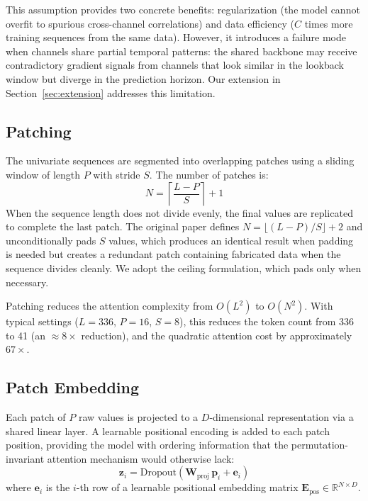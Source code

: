 \documentclass[11pt]{article}
\begin{document}
This assumption provides two concrete benefits: regularization (the model cannot overfit to spurious cross-channel correlations) and data efficiency ($C$ times more training sequences from the same data). However, it introduces a failure mode when channels share partial temporal patterns: the shared backbone may receive contradictory gradient signals from channels that look similar in the lookback window but diverge in the prediction horizon. Our extension in Section~\ref{sec:extension} addresses this limitation.

\subsection{Patching}

The univariate sequences are segmented into overlapping patches using a sliding window of length $P$ with stride $S$. The number of patches is:
\begin{equation}
    N = \left\lceil\frac{L - P}{S}\right\rceil + 1
\end{equation}
When the sequence length does not divide evenly, the final values are replicated to complete the last patch. The original paper defines $N = \lfloor(L{-}P)/S\rfloor + 2$ and unconditionally pads $S$ values, which produces an identical result when padding is needed but creates a redundant patch containing fabricated data when the sequence divides cleanly. We adopt the ceiling formulation, which pads only when necessary.

Patching reduces the attention complexity from $O(L^2)$ to $O(N^2)$. With typical settings ($L{=}336$, $P{=}16$, $S{=}8$), this reduces the token count from 336 to 41 (an ${\approx}8\times$ reduction), and the quadratic attention cost by approximately $67\times$.

\subsection{Patch Embedding}

Each patch of $P$ raw values is projected to a $D$-dimensional representation via a shared linear layer. A learnable positional encoding is added to each patch position, providing the model with ordering information that the permutation-invariant attention mechanism would otherwise lack:
\begin{equation}
    \mathbf{z}_i = \text{Dropout}\!\left(
        \mathbf{W}_{\text{proj}}\,\mathbf{p}_i + \mathbf{e}_i
    \right)
\end{equation}
where $\mathbf{e}_i$ is the $i$-th row of a learnable positional embedding matrix $\mathbf{E}_{\text{pos}} \in \mathbb{R}^{N \times D}$.
\end{document}
